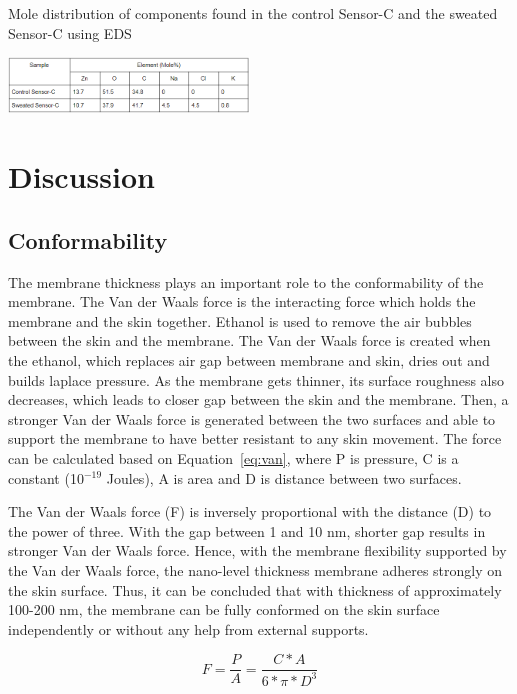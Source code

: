 \documentclass[journal]{IEEEtran}
\begin{document}
\begin{table}[H]
\begin{center}
\caption{Mole distribution of components found in the control Sensor-C and the sweated Sensor-C using EDS} \label{tab:sem}
\includegraphics[width=0.48\textwidth]{images/asd.PNG}
\end{center}
\end{table}

\section{Discussion}
\subsection{Conformability}

The membrane thickness plays an important role to the conformability of the membrane. The Van der Waals force is the interacting force which holds the membrane and the skin together. Ethanol is used to remove the air bubbles between the skin and the membrane. The Van der Waals force is created when the ethanol, which replaces air gap between membrane and skin, dries out and builds laplace pressure. As the membrane gets thinner, its surface roughness also decreases, which leads to closer gap between the skin and the membrane. Then, a stronger Van der Waals force is generated between the two surfaces and able to support the membrane to have better resistant to any skin movement. The force can be calculated based on Equation~\ref{eq:van}, where P is pressure, C is a constant (10$^{-19}$ Joules), A is area and D is distance between two surfaces. 

The Van der Waals force (F) is inversely proportional with the distance (D) to the power of three. With the gap between 1 and 10 nm, shorter gap results in stronger Van der Waals force. Hence, with the membrane flexibility supported by the Van der Waals force, the nano-level thickness membrane adheres strongly on the skin surface. Thus, it can be concluded that with thickness of approximately 100-200 nm, the membrane can be fully conformed on the skin surface independently or without any help from external supports.

\begin{equation}
    F = \frac{P}{A} = \frac{C * A}{6 * \pi * D^3} 
    \label{eq:van}
\end{equation}
\end{document}
